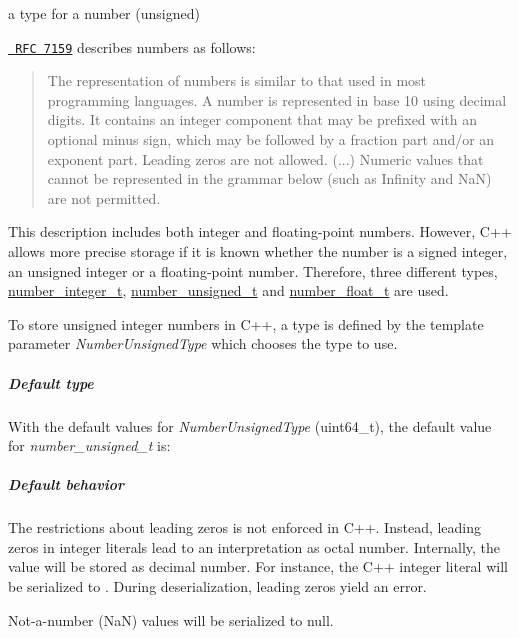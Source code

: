 a type for a number (unsigned) 

\href{http://rfc7159.net/rfc7159}{\texttt{ R\+FC 7159}} describes numbers as follows\+: \begin{quote}
The representation of numbers is similar to that used in most programming languages. A number is represented in base 10 using decimal digits. It contains an integer component that may be prefixed with an optional minus sign, which may be followed by a fraction part and/or an exponent part. Leading zeros are not allowed. (...) Numeric values that cannot be represented in the grammar below (such as Infinity and NaN) are not permitted. \end{quote}


This description includes both integer and floating-\/point numbers. However, C++ allows more precise storage if it is known whether the number is a signed integer, an unsigned integer or a floating-\/point number. Therefore, three different types, \mbox{\hyperlink{classnlohmann_1_1basic__json_a98e611d67b7bd75307de99c9358ab2dc}{number\+\_\+integer\+\_\+t}}, \mbox{\hyperlink{classnlohmann_1_1basic__json_ab906e29b5d83ac162e823ada2156b989}{number\+\_\+unsigned\+\_\+t}} and \mbox{\hyperlink{classnlohmann_1_1basic__json_a88d6103cb3620410b35200ee8e313d97}{number\+\_\+float\+\_\+t}} are used.

To store unsigned integer numbers in C++, a type is defined by the template parameter {\itshape Number\+Unsigned\+Type} which chooses the type to use.

\subparagraph*{Default type}

With the default values for {\itshape Number\+Unsigned\+Type} ({\ttfamily uint64\+\_\+t}), the default value for {\itshape number\+\_\+unsigned\+\_\+t} is\+:


\begin{DoxyCode}{0}
\end{DoxyCode}


\subparagraph*{Default behavior}


\begin{DoxyItemize}
\item The restrictions about leading zeros is not enforced in C++. Instead, leading zeros in integer literals lead to an interpretation as octal number. Internally, the value will be stored as decimal number. For instance, the C++ integer literal {} will be serialized to {}. During deserialization, leading zeros yield an error.
\item Not-\/a-\/number (NaN) values will be serialized to {\ttfamily null}.
\end{DoxyItemize}

